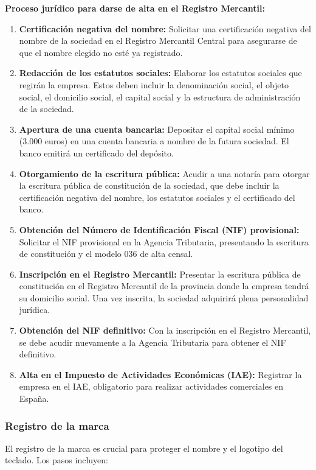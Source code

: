 \textbf{Proceso jurídico para darse de alta en el Registro Mercantil:}

\begin{enumerate}
    \item \textbf{Certificación negativa del nombre:} Solicitar una certificación negativa del nombre de la sociedad en el Registro Mercantil Central para asegurarse de que el nombre elegido no esté ya registrado.
    \item \textbf{Redacción de los estatutos sociales:} Elaborar los estatutos sociales que regirán la empresa. Estos deben incluir la denominación social, el objeto social, el domicilio social, el capital social y la estructura de administración de la sociedad.
    \item \textbf{Apertura de una cuenta bancaria:} Depositar el capital social mínimo (3.000 euros) en una cuenta bancaria a nombre de la futura sociedad. El banco emitirá un certificado del depósito.
    \item \textbf{Otorgamiento de la escritura pública:} Acudir a una notaría para otorgar la escritura pública de constitución de la sociedad, que debe incluir la certificación negativa del nombre, los estatutos sociales y el certificado del banco.
    \item \textbf{Obtención del Número de Identificación Fiscal (NIF) provisional:} Solicitar el NIF provisional en la Agencia Tributaria, presentando la escritura de constitución y el modelo 036 de alta censal.
    \item \textbf{Inscripción en el Registro Mercantil:} Presentar la escritura pública de constitución en el Registro Mercantil de la provincia donde la empresa tendrá su domicilio social. Una vez inscrita, la sociedad adquirirá plena personalidad jurídica.
    \item \textbf{Obtención del NIF definitivo:} Con la inscripción en el Registro Mercantil, se debe acudir nuevamente a la Agencia Tributaria para obtener el NIF definitivo.
    \item \textbf{Alta en el Impuesto de Actividades Económicas (IAE):} Registrar la empresa en el IAE, obligatorio para realizar actividades comerciales en España.
\end{enumerate}

\subsubsection{Registro de la marca}

El registro de la marca es crucial para proteger el nombre y el logotipo del teclado. Los pasos incluyen:

